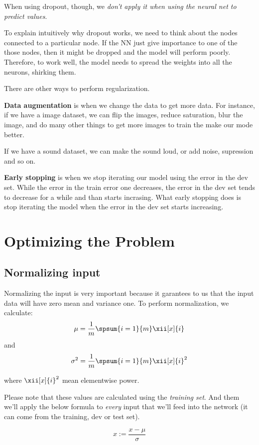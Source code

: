 \documentclass[12pt, a4paper, oneside]{book}
\begin{document}
When using dropout, though, we \textit{don't apply it when using the neural net
to predict values}.

To explain intuitively why dropout works, we need to think about the nodes
connected to a particular node. If the NN just give importance to one of the
those nodes, then it might be dropped and the model will perform poorly.
Therefore, to work well, the model needs to spread the weights into all the
neurons, shirking them.

There are other ways to perform regularization.

\textbf{Data augmentation} is when we change the data to get more data. For
instance, if we have a image dataset, we can flip the images, reduce saturation,
blur the image, and do many other things to get more images to train the make
our mode better.

If we have a sound dataset, we can make the sound loud, or add noise, supression
and so on.

\textbf{Early stopping} is when we stop iterating our model using the error in
the dev set. While the error in the train error one decreases, the error in the
dev set tends to decrease for a while and than starts incrasing. What early
stopping does is stop iterating the model when the error in the dev set starts
increasing.

\section{Optimizing the Problem}%
\label{sec:optimizing_the_problem}

\subsection{Normalizing input}%
\label{sub:normalizing_input}

Normalizing the input is very important because it garantees to us that the
input data will have zero mean and variance one. To perform normalization, we
calculate:
\[
\mu=\dfrac{1}{m}\spsum{i=1}{m}\xii[x]{i}
\]
and
\[
\sigma^2=\dfrac{1}{m}\spsum{i=1}{m}\xii[x]{i}^2
\]

where $\xii[x]{i}^2$ mean elementwise power.

Please note that these values are calculated using the \textit{training set}.
And them we'll apply the below formula to \textit{every} input that we'll feed
into the network (it can come from the training, dev or test set).

\[
x:=\dfrac{x-\mu}{\sigma}
\]
\end{document}
